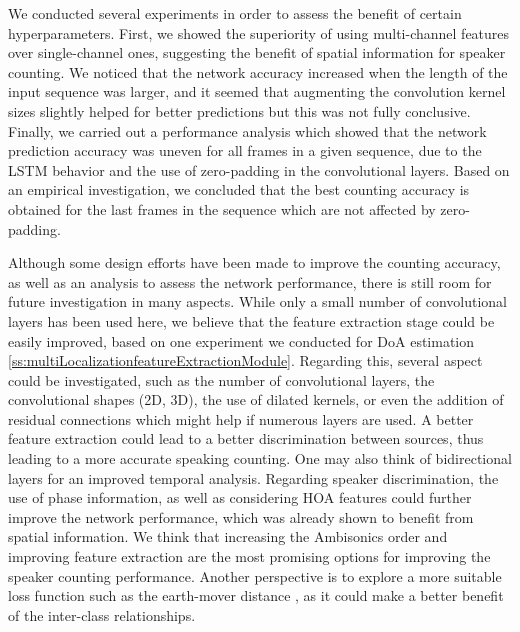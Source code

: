 We conducted several experiments in order to assess the benefit of certain hyperparameters. First, we showed the superiority of using multi-channel features over single-channel ones, suggesting the benefit of spatial information for speaker counting. We noticed that the network accuracy increased when the length of the input sequence was larger, and it seemed that augmenting the convolution kernel sizes slightly helped for better predictions but this was not fully conclusive. Finally, we carried out a performance analysis which showed that the network prediction accuracy was uneven for all frames in a given sequence, due to the LSTM behavior and the use of zero-padding in the convolutional layers. Based on an empirical investigation, we concluded that the best counting accuracy is obtained for the last frames in the sequence which are not affected by zero-padding.

Although some design efforts have been made to improve the counting accuracy, as well as an analysis to assess the network performance, there is still room for future investigation in many aspects. While only a small number of convolutional layers has been used here, we believe that the feature extraction stage could be easily improved, based on one experiment we conducted for DoA estimation \ref{ss:multiLocalizationfeatureExtractionModule}. Regarding this, several aspect could be investigated, such as the number of convolutional layers, the convolutional shapes (2D, 3D), the use of dilated kernels, or even the addition of residual connections which might help if numerous layers are used. A better feature extraction could lead to a better discrimination between sources, thus leading to a more accurate speaking counting. One may also think of bidirectional layers for an improved temporal analysis. Regarding speaker discrimination, the use of phase information, as well as considering HOA features could further improve the network performance, which was already shown to benefit from spatial information. We think that increasing the Ambisonics order and improving feature extraction are the most promising options for improving the speaker counting performance. Another perspective is to explore a more suitable loss function such as the earth-mover distance \cite{hou_squared_2016}, as it could make a better benefit of the inter-class relationships.
